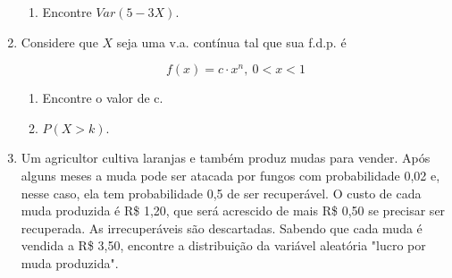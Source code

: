 \begin{enumerate}
\begin{enumerate}[label=\alph*.]
		\item Encontre $Var(5-3X)$.
		
		
	\end{enumerate}
	
\item Considere que $X$ seja uma v.a. contínua tal que sua f.d.p. é

\[f(x)=c\cdot x^{n},\ 0<x<1\]

	\begin{enumerate}[label=\alph*)]
		\item Encontre o valor de c.
		
		
		\item $P(X > k)$.
		
		
	\end{enumerate}
	
\item Um agricultor cultiva laranjas e também produz mudas para vender. Após alguns meses a muda pode ser atacada por fungos com probabilidade 0,02 e, nesse caso, ela tem probabilidade 0,5 de ser recuperável. O custo de cada muda produzida é R\$ 1,20, que será acrescido de mais R\$ 0,50 se precisar ser recuperada. As irrecuperáveis são descartadas.
Sabendo que cada muda é vendida a R\$ 3,50, encontre a distribuição da variável aleatória "lucro por muda produzida".


\end{enumerate}
